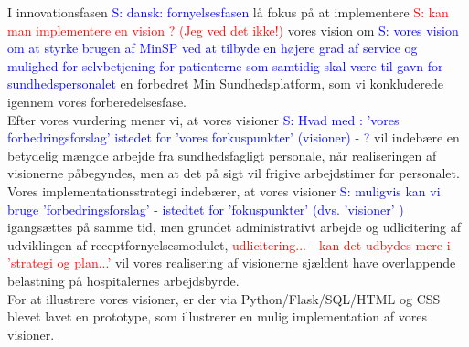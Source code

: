I innovationsfasen 
\textcolor{blue}{S: dansk: fornyelsesfasen} lå fokus på at implementere 
\textcolor{red}{S: kan man implementere en vision ? (Jeg ved det ikke!) } 
vores vision om 
\textcolor{blue}{S: vores vision om at styrke brugen af MinSP ved at tilbyde en højere grad af service og mulighed for selvbetjening for patienterne som samtidig skal være til gavn for sundhedspersonalet}
en forbedret Min Sundhedsplatform, som vi konkluderede igennem vores forberedelsesfase.\\
Efter vores vurdering mener vi, at vores visioner 
\textcolor{blue}{S: Hvad med  : 'vores forbedringsforslag' istedet for 'vores forkuspunkter' (visioner) - ?}
 vil indebære en betydelig mængde arbejde fra sundhedsfagligt personale, når realiseringen af visionerne påbegyndes, men at det på sigt vil frigive arbejdstimer for personalet.\\
Vores implementationsstrategi indebærer, at vores visioner 
\textcolor{blue}{S: muligvis kan vi bruge 'forbedringsforslag' - istedtet for 'fokuspunkter' (dvs. 'visioner' )}
 igangsættes på samme tid, men grundet administrativt arbejde og udlicitering af udviklingen af receptfornyelsesmodulet,
 \textcolor{red}{udlicitering... - kan det udbydes mere i 'strategi og plan...'}
 vil vores realisering af visionerne sjældent have overlappende belastning på hospitalernes arbejdsbyrde.\\
For at illustrere vores visioner, er der via Python/Flask/SQL/HTML og CSS blevet lavet en prototype, som illustrerer en mulig implementation af vores visioner.\\
